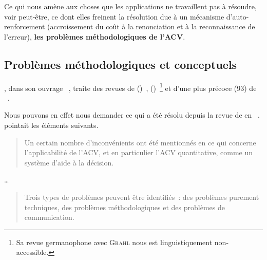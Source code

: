 Ce qui nous amène aux choses que les applications ne travaillent pas à résoudre, voir peut-être, ce dont elles freinent la résolution due à un mécanisme d'auto-renforcement (accroissement du coût à la renonciation et à la reconnaissance de l'erreur), \textbf{les problèmes méthodologiques de l'ACV}.
\subsection{Problèmes méthodologiques et conceptuels}
\label{subsec:Problèmes méthodologiques}
\citeauthor{klopffer_background_2014}, dans son ouvrage ~\cite{klopffer_background_2014}, traite des revues de \citeauthor{reap_survey_2008} ()~\cite{reap_survey_2008}, \citeauthor{finnveden_recent_2009} ()~\cite{finnveden_recent_2009}\footnote{Sa revue germanophone avec \textsc{Grahl} nous est linguistiquement non-accessible.}
et d'une plus précoce (93) de \citeauthor{udo_de_haes_applications_1993}~\cite{udo_de_haes_applications_1993}.

Nous pouvons en effet nous demander ce qui a été résolu depuis la revue de \citeauthor{udo_de_haes_applications_1993} en \citeyear{udo_de_haes_applications_1993}~\cite{udo_de_haes_applications_1993}.
\citeauthor{udo_de_haes_applications_1993} pointait les éléments suivants.

\blockcquote[traduction]{udo_de_haes_applications_1993}{
Un certain nombre d'inconvénients ont été mentionnés en ce qui concerne l'applicabilité de l'ACV, et en particulier l'ACV quantitative, comme un système d'aide à la décision.}\ldots
\blockcquote[traduction]{udo_de_haes_applications_1993}{
Trois types de problèmes peuvent être identifiés~:
des problèmes purement techniques, des problèmes méthodologiques et des problèmes de communication.
}

